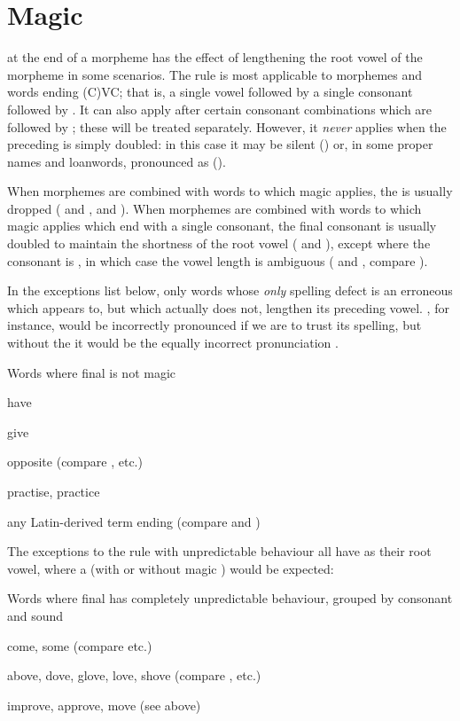 \section{Magic }

 at the end of a morpheme has the effect of lengthening the root vowel of
the morpheme in some scenarios. The rule is most applicable to morphemes and
words ending (C)VC; that is, a single vowel followed by a single consonant
followed by . It can also apply after certain consonant combinations which
are followed by ; these will be treated separately. However, it
\emph{never} applies when the preceding is simply doubled: in this case it may
be silent () or, in some proper names and loanwords,
pronounced as  ().

When morphemes are combined with words to which magic  applies, the 
is usually dropped ( and ,  and ). When
morphemes are combined with words to which magic  applies which end with a
single consonant, the final consonant is usually doubled to maintain the
shortness of the root vowel ( and ), except where the
consonant is , in which case the vowel length is ambiguous ( and
, compare ).

In the exceptions list below, only words whose \emph{only} spelling defect is an
erroneous  which appears to, but which actually does not, lengthen its
preceding vowel. , for instance, would be incorrectly pronounced
 if we are to trust its spelling, but without the  it would be
the equally incorrect pronunciation .

\begin{exceptions}{Words where final  is not magic}
\item have
\item give
\item opposite (compare , etc.)
\item practise, practice
\item any Latin-derived term ending  (compare  and )
\end{exceptions}

The exceptions to the rule with unpredictable behaviour all have  as their
root vowel, where a  (with or without magic ) would be expected:

\begin{exceptions}{Words where final  has completely unpredictable behaviour, grouped by consonant and sound}
\item come, some (compare  etc.)
\item above, dove, glove, love, shove (compare , etc.)
\item improve, approve, move (see above)
\end{exceptions}

